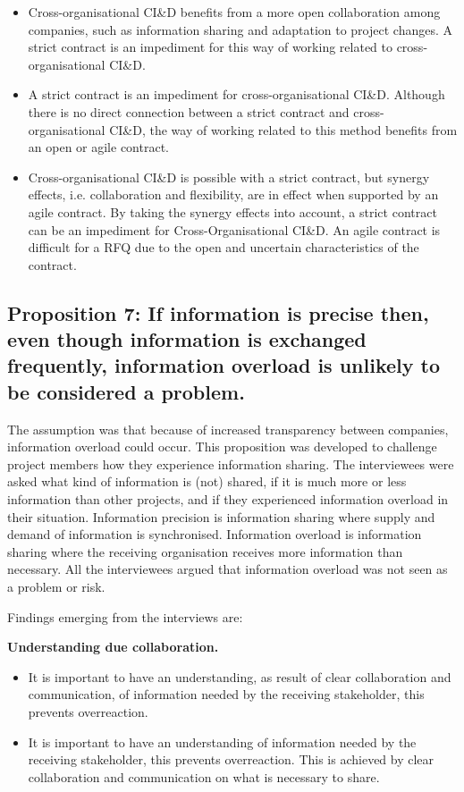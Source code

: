 \begin{itemize}
\item Cross-organisational CI\&D benefits from a more open collaboration among companies, such as information sharing and adaptation to project changes. A strict contract is an impediment for this way of working related to cross-organisational CI\&D.
\item A strict contract is an impediment for cross-organisational CI\&D. Although there is no direct connection between a strict contract and cross-organisational CI\&D, the way of working related to this method benefits from an open or agile contract.
\item Cross-organisational CI\&D is possible with a strict contract, but synergy effects, i.e. collaboration and flexibility, are in effect when supported by an agile contract. By taking the synergy effects into account, a strict contract can be an impediment for Cross-Organisational CI\&D. An agile contract is difficult for a RFQ due to the open and uncertain characteristics of the contract.
\end{itemize}

\subsection{Proposition 7: If information is precise then, even though information is exchanged frequently, information overload is unlikely to be considered a problem.}

The assumption was that because of increased transparency between companies, information overload could occur. This proposition was developed to challenge project members how they experience information sharing. The interviewees were asked what kind of information is (not) shared, if it is much more or less information than other projects, and if they experienced information overload in their situation. Information precision is information sharing where supply and demand of information is synchronised. Information overload is information sharing where the receiving organisation receives more information than necessary. All the interviewees argued that information overload was not seen as a problem or risk.

Findings emerging from the interviews are:

{\bf Understanding due collaboration.} 

\begin{itemize}
\item It is important to have an understanding, as result of clear collaboration and communication, of information needed by the receiving stakeholder, this prevents overreaction.
\item It is important to have an understanding of information needed by the receiving stakeholder, this prevents overreaction. This is achieved by clear collaboration and communication on what is necessary to share.
\end{itemize}


